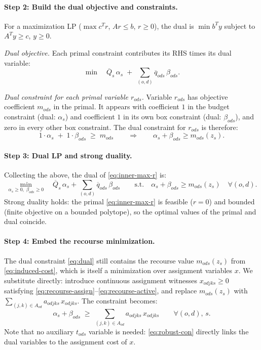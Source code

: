 \documentclass[11pt]{article}
\theoremstyle{definition}
\begin{document}
\paragraph{Step 2: Build the dual objective and constraints.}
For a maximization LP ($\max c^T r$, $Ar \le b$, $r \ge 0$), the dual is
$\min b^T y$ subject to $A^T y \ge c$, $y \ge 0$.

\textit{Dual objective.}
Each primal constraint contributes its RHS times its dual variable:
\[
	\min\quad \overline{Q}_s\,\alpha_s \;+\; \sum_{(o,d)} \overline{q}_{ods}\,\beta_{ods}.
\]

\textit{Dual constraint for each primal variable $r_{ods}$.}
Variable $r_{ods}$ has objective coefficient $m_{ods}$ in the primal.
It appears with coefficient $1$ in the budget constraint (dual: $\alpha_s$)
and coefficient $1$ in its own box constraint (dual: $\beta_{ods}$), and
zero in every other box constraint.  The dual constraint for $r_{ods}$ is
therefore:
\[
	1\cdot\alpha_s \;+\; 1\cdot\beta_{ods} \;\ge\; m_{ods}
	\qquad\Longrightarrow\qquad
	\alpha_s + \beta_{ods} \ge m_{ods}(z_s).
\]

\paragraph{Step 3: Dual LP and strong duality.}
Collecting the above, the dual of \eqref{eq:inner-max-r} is:
\begin{equation}
	\min_{\alpha_s \ge 0,\;\beta_{ods} \ge 0}
	\quad
	\overline{Q}_s\,\alpha_s + \sum_{(o,d)} \overline{q}_{ods}\,\beta_{ods}
	\qquad
	\text{s.t.}\quad
	\alpha_s + \beta_{ods} \ge m_{ods}(z_s)
	\quad \forall (o,d).
	\label{eq:dual}
\end{equation}
Strong duality holds: the primal \eqref{eq:inner-max-r} is feasible ($r=0$)
and bounded (finite objective on a bounded polytope), so the optimal values
of the primal and dual coincide.

\paragraph{Step 4: Embed the recourse minimization.}
The dual constraint \eqref{eq:dual} still contains the recourse value
$m_{ods}(z_s)$ from \eqref{eq:induced-cost}, which is itself a minimization
over assignment variables $x$.  We substitute directly: introduce continuous
assignment witnesses $x_{odjks} \ge 0$ satisfying
\eqref{eq:recourse-assign}--\eqref{eq:recourse-active}, and replace
$m_{ods}(z_s)$ with $\sum_{(j,k)\in A_{od}} a_{odjks}\,x_{odjks}$.  The constraint becomes:
\begin{equation}
	\alpha_s + \beta_{ods}
	\;\ge\;
	\sum_{(j,k)\in A_{od}} a_{odjks}\,x_{odjks}
	\qquad \forall (o,d),\, s.
	\label{eq:robust-con}
\end{equation}
Note that no auxiliary $t_{ods}$ variable is needed: \eqref{eq:robust-con}
directly links the dual variables to the assignment cost of $x$.
\end{document}
